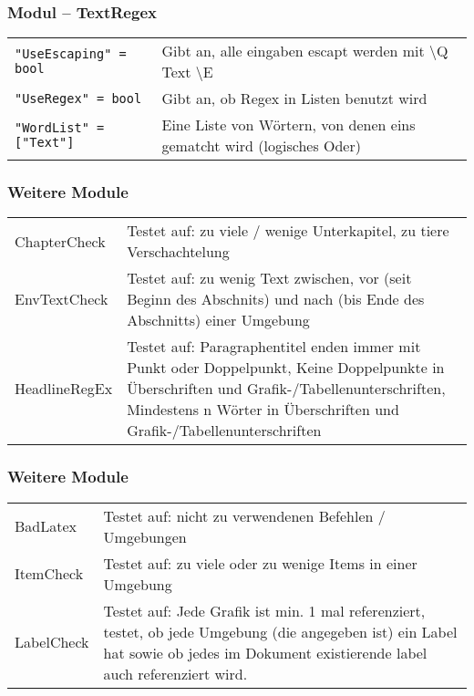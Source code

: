 \begin{frame}[fragile]
\frametitle{Modul -- TextRegex}
\begin{block}{\vspace*{-3ex}}
\begin{table}[h]
	\begin{tabular}{l|p{5cm}}
			\lstinline|"UseEscaping" = bool| & Gibt an, alle eingaben escapt werden mit \textbackslash Q Text \textbackslash E\\
			\lstinline|"UseRegex" = bool| & Gibt an, ob Regex in Listen benutzt wird\\
			\lstinline|"WordList" = ["Text"]| & Eine Liste von Wörtern, von denen eins gematcht wird (logisches Oder)
	\end{tabular}
\end{table}
\end{block}
\end{frame}

\begin{frame}[fragile]
\frametitle{Weitere Module}
\begin{block}{\vspace*{-3ex}}
\begin{table}[h]
	\begin{tabular}{l|p{7cm}}
			ChapterCheck & Testet auf: zu viele / wenige Unterkapitel, zu tiere Verschachtelung\\
			EnvTextCheck & Testet auf: zu wenig Text zwischen, vor (seit Beginn des Abschnits) und nach (bis Ende des Abschnitts) einer Umgebung\\
			HeadlineRegEx & Testet auf: Paragraphentitel enden immer mit Punkt oder Doppelpunkt, Keine Doppelpunkte in Überschriften und Grafik-/Tabellenunterschriften, Mindestens n Wörter in Überschriften und Grafik-/Tabellenunterschriften
	\end{tabular}
\end{table}
\end{block}
\end{frame}

\begin{frame}[fragile]
\frametitle{Weitere Module}
\begin{block}{\vspace*{-3ex}}
\begin{table}[h]
	\begin{tabular}{l|p{7cm}}
			BadLatex & Testet auf: nicht zu verwendenen Befehlen / Umgebungen\\
			ItemCheck & Testet auf: zu viele oder zu wenige Items in einer Umgebung\\
			LabelCheck & Testet auf: Jede Grafik ist min. 1 mal referenziert, testet, ob jede Umgebung (die angegeben ist) ein Label hat sowie ob jedes im Dokument existierende label auch referenziert wird.
	\end{tabular}
\end{table}
\end{block}
\end{frame}


